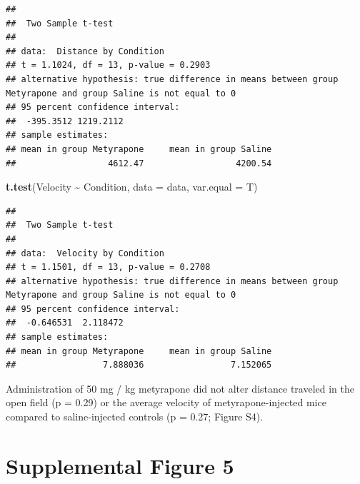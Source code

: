 \documentclass[
]{book}
\newenvironment{Shaded}{\begin{snugshade}}{\end{snugshade}}
\newcommand{\AttributeTok}[1]{\textcolor[rgb]{0.13,0.29,0.53}{#1}}
\newcommand{\FunctionTok}[1]{\textcolor[rgb]{0.13,0.29,0.53}{\textbf{#1}}}
\newcommand{\NormalTok}[1]{#1}
\newcommand{\SpecialCharTok}[1]{\textcolor[rgb]{0.81,0.36,0.00}{\textbf{#1}}}
\begin{document}
\begin{verbatim}
## 
##  Two Sample t-test
## 
## data:  Distance by Condition
## t = 1.1024, df = 13, p-value = 0.2903
## alternative hypothesis: true difference in means between group Metyrapone and group Saline is not equal to 0
## 95 percent confidence interval:
##  -395.3512 1219.2112
## sample estimates:
## mean in group Metyrapone     mean in group Saline 
##                  4612.47                  4200.54
\end{verbatim}

\begin{Shaded}
\begin{Highlighting}[]
\FunctionTok{t.test}\NormalTok{(Velocity }\SpecialCharTok{\textasciitilde{}}\NormalTok{ Condition, }\AttributeTok{data =}\NormalTok{ data, }\AttributeTok{var.equal =}\NormalTok{ T)}
\end{Highlighting}
\end{Shaded}

\begin{verbatim}
## 
##  Two Sample t-test
## 
## data:  Velocity by Condition
## t = 1.1501, df = 13, p-value = 0.2708
## alternative hypothesis: true difference in means between group Metyrapone and group Saline is not equal to 0
## 95 percent confidence interval:
##  -0.646531  2.118472
## sample estimates:
## mean in group Metyrapone     mean in group Saline 
##                 7.888036                 7.152065
\end{verbatim}

Administration of 50 mg / kg metyrapone did not alter distance traveled in the open field (p = 0.29) or the average velocity of metyrapone-injected mice compared to saline-injected controls (p = 0.27; Figure S4).

\chapter*{Supplemental Figure 5}\label{supplemental-figure-5}
\end{document}
